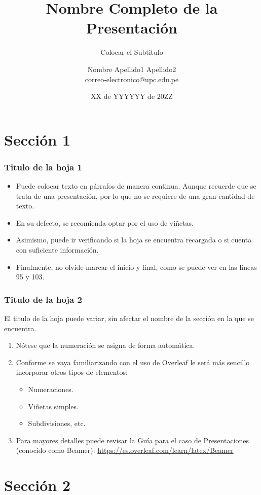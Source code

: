 \documentclass[fleqn]{beamer}
\title[Nombre Corto de la Presentación] {Nombre Completo de la Presentación}
\subtitle[Subtitulo]{Colocar el Subtitulo} %
\author[N, Apellido1 (Año)]{Nombre Apellido1 Apellido2\texorpdfstring{\\}{, }correo-electronico@upc.edu.pe}
\institute[Facultad de Economía - UPC]{Facultad de Economía\\Universidad Peruana de Ciencias Aplicadas}
\date{XX de YYYYYY de 20ZZ} %
\begin{document}
\begin{frame}
  \titlepage
\end{frame}

\section{Sección 1}

\begin{frame}
\frametitle{Titulo de la hoja 1}
\begin{itemize}
    \item Puede colocar texto en párrafos de manera continua. Aunque recuerde que se trata de una presentación, por lo que no se requiere de una gran cantidad de texto.
    \item En su defecto, se recomienda optar por el uso de viñetas.
    \item Asimismo, puede ir verificando si la hoja se encuentra recargada o si cuenta con suficiente información.
    \item Finalmente, no olvide marcar el inicio y final, como se puede ver en las líneas 95 y 103.
\end{itemize}
\end{frame}

\begin{frame}
\frametitle{Titulo de la hoja 2}
El titulo de la hoja puede variar, sin afectar el nombre de la sección en la que se encuentra.\medskip\par

\begin{enumerate}
    \item Nótese que la numeración se asigna de forma automática.
    \item Conforme se vaya familiarizando con el uso de Overleaf le será más sencillo incorporar otros tipos de elementos:
    \begin{itemize}
        \item Numeraciones.
        \item Viñetas simples.
        \item Subdivisiones, etc.
    \end{itemize}
    \item Para mayores detalles puede revisar la Guía para el caso de Presentaciones (conocido como Beamer): \hyperlink{}{https://es.overleaf.com/learn/latex/Beamer}
\end{enumerate}
\end{frame}
\section{Sección 2}
\end{document}
